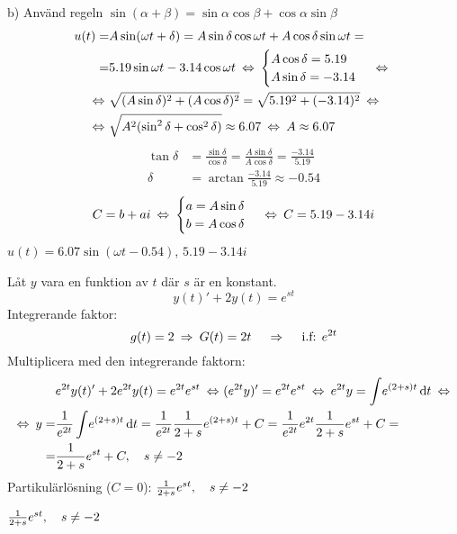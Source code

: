 \begin{task}{b)}
	Använd regeln $\sin(\alpha+\beta)=\sin\alpha\cos\beta+\cos\alpha\sin\beta$
	\begin{align*}
	u(t)=
	&A\sin(\omega t + \delta)=
	A\sin\delta\cos\omega t + A\cos\delta\sin\omega t= \\ =
	&5.19\sin\omega t - 3.14\cos\omega t \lra
	\begin{cases}
	A\cos\delta = 5.19 \\
	A\sin\delta = -3.14
	\end{cases} \lra \\ \lra
	&\sqrt{(A\sin\delta)^2+(A\cos\delta)^2}=\sqrt{5.19^2+(-3.14)^2} \lra \\ \lra
	&\sqrt{A^2(\sin^2\delta+\cos^2\delta)}\approx 6.07 \lra
	A\approx 6.07
	\end{align*}
	\begin{align*}
	\tan\delta&=
	\frac{\sin\delta}{\cos\delta}=
	\frac{A\sin\delta}{A\cos\delta}=
	\frac{-3.14}{5.19} \\
	\delta&=
	\arctan\frac{-3.14}{5.19}\approx 
	-0.54
	\end{align*}
	\[C=b+ai \lra
	\begin{cases}
	a = A\sin\delta \\
	b = A\cos\delta
	\end{cases} \lra
	C= 5.19-3.14i\]
	\ans $u(t)=6.07\sin(\omega t - 0.54)$, $5.19-3.14i$
\end{task}

\begin{task}{1.16}
	Låt $y$ vara en funktion av $t$ där $s$ är en konstant.
	\[y(t)'+2y(t)=e^{st}\]
	Integrerande faktor:
	\[g(t)=2\ra
	G(t)=2t\quad\ra\quad 
	\text{i.f: }e^{2t}\]
	Multiplicera med den integrerande faktorn:
	\begin{align*}
	&e^{2t}y(t)'+2e^{2t}y(t)=e^{2t}e^{st} \lra
	(e^{2t}y)'=e^{2t}e^{st} \lra
	e^{2t}y=\int \! e^{(2+s)t} \, \mathrm{d}t \lra \\ \lra
	y=&\frac{1}{e^{2t}}\int \! e^{(2+s)t} \, \mathrm{d}t =
	\frac{1}{e^{2t}}\frac{1}{2+s}e^{(2+s)t} + C=
	\frac{1}{e^{2t}}e^{2t}\frac{1}{2+s}e^{st} + C= \\ =
	&\frac{1}{2+s}e^{st} + C \cond{s\neq-2}
	\end{align*}
	Partikulärlösning ($C=0$): $\frac{1}{2+s}e^{st} , \quad s\neq-2$
	
	\ans $\frac{1}{2+s}e^{st} , \quad s\neq-2$
\end{task}